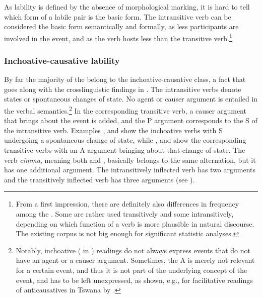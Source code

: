 As lability is defined by the absence of morphological marking, it is hard to tell which form of a labile pair is the basic form.  The intransitive verb can be considered the basic form semantically and formally, as less participants are involved in the event, and as the verb hosts less  than the transitive verb.\footnote{From a first impression, there are definitely also differences in frequency among the . Some are rather used transitively and some intransitively, depending on which function of a verb is more plausible in natural discourse. The existing corpus is not big enough for significant statistic analyses.} 
 
\subsubsection{Inchoative-causative lability}

By far the majority of the  belong to the inchoative-causative class, a fact that goes along with the crosslinguistic findings in \citet{Letuchiy2009Labile}. The intransitive verbs denote states or spontaneous changes of state. No agent or causer argument is entailed in the verbal semantics.\footnote{Notably, inchoative ( in \citealt{Creissels2012_Lability}) readings do not always express events that do not have an agent or a causer argument. Sometimes, the A is merely not relevant for a certain event, and thus it is not part of the underlying concept of the event, and has to be left unexpressed, as shown, e.g., for facilitative readings of anticausatives in Tswana by \citet{Creissels2012_Lability}.} In the corresponding transitive verb, a causer argument that brings about the event is added, and the P argument  corresponds to the S of the intransitive verb. Examples \Next[a], \Next[c] and \Next[e] show the inchoative verbs with S undergoing a spontaneous change of state, while \Next[b], \Next[d] and \Next[f] show the corresponding transitive verbs with an A argument bringing about that change of state. The verb \emph{cimma}, meaning both  and , basically belongs to the same alternation, but it has one additional argument. The intransitively inflected verb has two arguments and the transitively inflected verb has three arguments (see ).  


